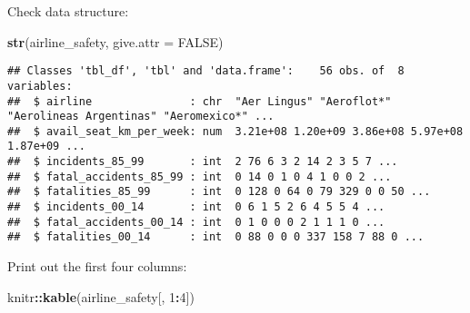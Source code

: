\documentclass[]{article}
\newenvironment{Shaded}{\begin{snugshade}}{\end{snugshade}}
\newcommand{\KeywordTok}[1]{\textcolor[rgb]{0.13,0.29,0.53}{\textbf{#1}}}
\newcommand{\DataTypeTok}[1]{\textcolor[rgb]{0.13,0.29,0.53}{#1}}
\newcommand{\DecValTok}[1]{\textcolor[rgb]{0.00,0.00,0.81}{#1}}
\newcommand{\OtherTok}[1]{\textcolor[rgb]{0.56,0.35,0.01}{#1}}
\newcommand{\OperatorTok}[1]{\textcolor[rgb]{0.81,0.36,0.00}{\textbf{#1}}}
\newcommand{\NormalTok}[1]{#1}
\begin{document}
Check data structure:

\begin{Shaded}
\begin{Highlighting}[]
\KeywordTok{str}\NormalTok{(airline_safety, }\DataTypeTok{give.attr =} \OtherTok{FALSE}\NormalTok{)}
\end{Highlighting}
\end{Shaded}

\begin{verbatim}
## Classes 'tbl_df', 'tbl' and 'data.frame':    56 obs. of  8 variables:
##  $ airline               : chr  "Aer Lingus" "Aeroflot*" "Aerolineas Argentinas" "Aeromexico*" ...
##  $ avail_seat_km_per_week: num  3.21e+08 1.20e+09 3.86e+08 5.97e+08 1.87e+09 ...
##  $ incidents_85_99       : int  2 76 6 3 2 14 2 3 5 7 ...
##  $ fatal_accidents_85_99 : int  0 14 0 1 0 4 1 0 0 2 ...
##  $ fatalities_85_99      : int  0 128 0 64 0 79 329 0 0 50 ...
##  $ incidents_00_14       : int  0 6 1 5 2 6 4 5 5 4 ...
##  $ fatal_accidents_00_14 : int  0 1 0 0 0 2 1 1 1 0 ...
##  $ fatalities_00_14      : int  0 88 0 0 0 337 158 7 88 0 ...
\end{verbatim}

Print out the first four columns:

\begin{Shaded}
\begin{Highlighting}[]
\NormalTok{knitr}\OperatorTok{::}\KeywordTok{kable}\NormalTok{(airline_safety[, }\DecValTok{1}\OperatorTok{:}\DecValTok{4}\NormalTok{])}
\end{Highlighting}
\end{Shaded}
\end{document}
